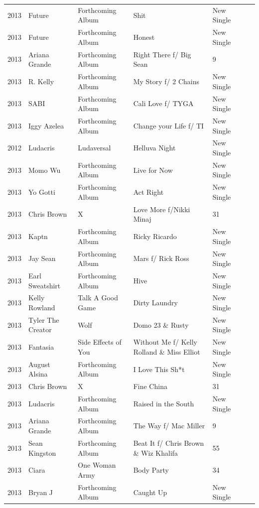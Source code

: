 \documentclass{article}
\begin{document}
\begin{tabular}{lllllll}
2013 & Future & Forthcoming Album & Shit & New Single &  &  \\
2013 & Future & Forthcoming Album & Honest & New Single &  &  \\
2013 & Ariana Grande & Forthcoming Album & Right There f/ Big Sean & 9 &  &  \\
2013 & R. Kelly & Forthcoming Album & My Story f/ 2 Chains & New Single &  &  \\
2013 & SABI & Forthcoming Album & Cali Love f/ TYGA & New Single &  &  \\
2013 & Iggy Azelea & Forthcoming Album & Change your Life f/ TI & New Single &  &  \\
2012 & Ludacris & Ludaversal & Helluva Night & New Single &  &  \\
2013 & Momo Wu & Forthcoming Album & Live for Now & New Single &  &  \\
2013 & Yo Gotti & Forthcoming Album & Act Right & New Single &  &  \\
2013 & Chris Brown & X & Love More f/Nikki Minaj & 31 &  &  \\
2013 & Kaptn & Forthcoming Album & Ricky Ricardo & New Single &  &  \\
2013 & Jay Sean & Forthcoming Album & Mars f/ Rick Ross & New Single &  &  \\
2013 & Earl Sweatshirt & Forthcoming Album & Hive & New Single &  &  \\
2013 & Kelly Rowland & Talk A Good Game & Dirty Laundry & New Single &  &  \\
2013 & Tyler The Creator & Wolf & Domo 23 \& Rusty & New Single &  &  \\
2013 & Fantasia & Side Effects of You & Without Me f/ Kelly Rolland \& Miss Elliot & New Single &  &  \\
2013 & August Alsina & Forthcoming Album & I Love This Sh*t & New Single &  &  \\
2013 & Chris Brown & X & Fine China & 31 &  &  \\
2013 & Ludacris & Forthcoming Album & Raised in the South & New Single &  &  \\
2013 & Ariana Grande & Forthcoming Album & The Way f/ Mac Miller & 9 &  &  \\
2013 & Sean Kingston & Forthcoming Album & Beat It f/ Chris Brown \& Wiz Khalifa & 55 &  &  \\
2013 & Ciara & One Woman Army & Body Party & 34 &  &  \\
2013 & Bryan J & Forthcoming Album & Caught Up & New Single &  &  \\

\end{tabular}
\end{document}
